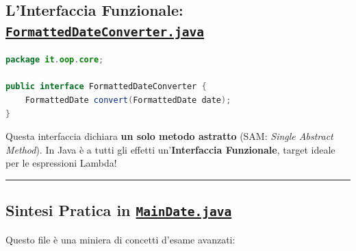 \documentclass[11pt,a4paper,oneside]{report}
\begin{document}
\subsection{\texorpdfstring{L'Interfaccia Funzionale:
\href{file:///home/wally/Documenti/GitHub/Programmazione-II/25-26/Teoria-e-Esercitazioni/Codice-20260902/Lezione13/MavenDate/src/main/java/it/oop/core/FormattedDateConverter.java}{\texttt{FormattedDateConverter.java}}}{L'Interfaccia Funzionale: FormattedDateConverter.java}}\label{chap12_linterfaccia-funzionale-formatteddateconverter.java}

\begin{lstlisting}[language=Java]
package it.oop.core;

public interface FormattedDateConverter {
    FormattedDate convert(FormattedDate date);
}
\end{lstlisting}

Questa interfaccia dichiara \textbf{un solo metodo astratto} (SAM:
\emph{Single Abstract Method}). In Java è a tutti gli effetti
un'\textbf{Interfaccia Funzionale}, target ideale per le espressioni
Lambda!

\begin{center}\rule{0.5\linewidth}{0.5pt}\end{center}

\subsection{\texorpdfstring{Sintesi Pratica in
\href{file:///home/wally/Documenti/GitHub/Programmazione-II/25-26/Teoria-e-Esercitazioni/Codice-20260902/Lezione13/MavenDate/src/main/java/it/oop/ui/MainDate.java}{\texttt{MainDate.java}}}{Sintesi Pratica in MainDate.java}}\label{chap12_sintesi-pratica-in-maindate.java}

Questo file è una miniera di concetti d'esame avanzati:
\end{document}
